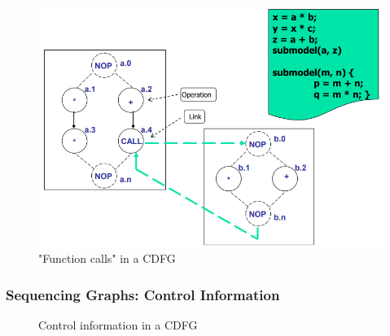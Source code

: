 \documentclass{article}
\begin{document}
\begin{figure}[htp]
    \centering
    \includegraphics[width=12cm, scale=1]{S1/sequencing_hierarchy.PNG}
    \caption{"Function calls" in a CDFG}
\end{figure}

\subsubsection{Sequencing Graphs: Control Information}

\begin{figure}[htp]%
    \centering
    \qquad
    \caption{Control information in a CDFG}%
\end{figure}
\end{document}

